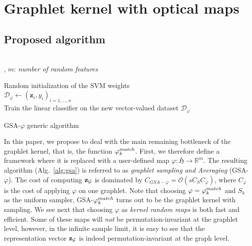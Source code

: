 \documentclass{article}
\begin{document}
\section{Graphlet kernel with optical maps} \label{ssed to get a lowerec:pagestyle}
\subsection{Proposed algorithm}
\label{sec:algo}
\begin{algorithm}[h]\label{alg:gsa}
\DontPrintSemicolon
  \\
  , $m$: \emph{number of random features}\\
  
  \Algo{\\}
  Random initialization of the SVM weights\\
  $\mathcal{D}_{\varphi}\gets (\mathbf{z}_i,y_i)_{i=1,\ldots, n}$\\
  Train the linear classifier on the new vector-valued dataset $\mathcal{D}_{\varphi}$
\caption{GSA-$\varphi$ generic algorithm}
\end{algorithm}

In this paper, we propose to deal with the main remaining bottleneck of the graphlet kernel, that is, the function $\varphi^{match}_k$. First, we therefore define a framework where it is replaced with a user-defined map $\varphi: \bar{\mathfrak{H}} \to \mathbb{R}^m$. %
The resulting algorithm (Alg.~\ref{alg:gsa}) is referred to as \emph{graphlet sampling and Averaging} (GSA-$\varphi$). The cost of computing $\mathbf{z}_{\mathcal{G}}$ is dominated by $C_{GSA-\varphi}= \mathcal{O}\left(s C_S C_{\varphi}\right)$, where $C_{\varphi}$ is the cost of applying $\varphi$ on one graphlet.
%
Note that choosing $\varphi = \varphi^{match}_k$ and $S_k$ as the uniform sampler, GSA-$\varphi^{match}_k$ turns out to be the graphlet kernel with sampling.
We see next that choosing $\varphi$ as \emph{kernel random maps} is both fast and efficient. Some of these maps will \emph{not} be permutation-invariant at the graphlet level, however, in the infinite sample limit, it is easy to see that the representation vector $\mathbf{z}_{\mathcal{G}}$ is indeed permutation-invariant at the graph level.
\end{document}
